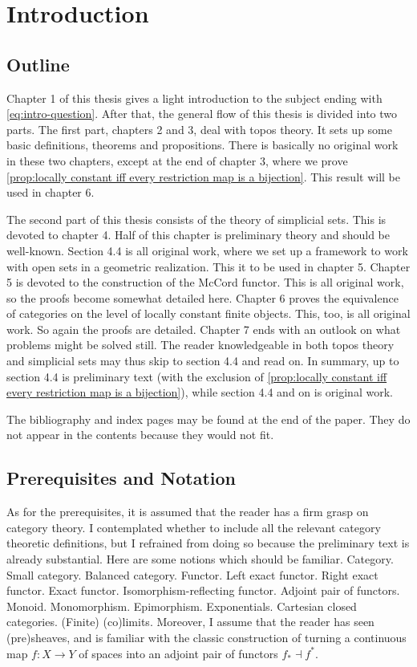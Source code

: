 %
%

\chapter{Introduction}

\section{Outline}

Chapter 1 of this thesis gives a light introduction to the subject ending with \cref{eq:intro-question}.
After that, the general flow of this thesis is divided into two parts. The first part, chapters 2 and 3, deal with topos theory. It sets up some basic definitions, theorems and propositions. There is basically no original work in these two chapters, except at the end of chapter 3, where we prove \cref{prop:locally constant iff every restriction map is a bijection}. This result will be used in chapter 6.

The second part of this thesis consists of the theory of simplicial sets. This is devoted to chapter 4. Half of this chapter is preliminary theory and should be well-known. Section 4.4 is all original work, where we set up a framework to work with open sets in a geometric realization. This it to be used in chapter 5.
Chapter 5 is devoted to the construction of the McCord functor. This is all original work, so the proofs become somewhat detailed here.
Chapter 6 proves the equivalence of categories on the level of locally constant finite objects. This, too, is all original work. So again the proofs are detailed.
Chapter 7 ends with an outlook on what problems might be solved still.
The reader knowledgeable in both topos theory and simplicial sets may thus skip to section 4.4 and read on.
In summary, up to section 4.4 is preliminary text (with the exclusion of \cref{prop:locally constant iff every restriction map is a bijection}), while section 4.4 and on is original work.

The bibliography and index pages may be found at the end of the paper. They do not appear in the contents because they would not fit.

\newpage
\section{Prerequisites and Notation}

As for the prerequisites, it is assumed that the reader has a firm grasp on category theory. I contemplated whether to include all the relevant category theoretic definitions, but I refrained from doing so because the preliminary text is already substantial. Here are some notions which should be familiar. Category. Small category. Balanced category. Functor. Left exact functor. Right exact functor. Exact functor. Isomorphism-reflecting functor. Adjoint pair of functors. Monoid. Monomorphism. Epimorphism. Exponentials. Cartesian closed categories. (Finite) (co)limits.
Moreover, I assume that the reader has seen (pre)sheaves, and is familiar with the classic construction of turning a continuous map $f : X \to Y$ of spaces into an adjoint pair of functors $f_* \dashv f^*$.

